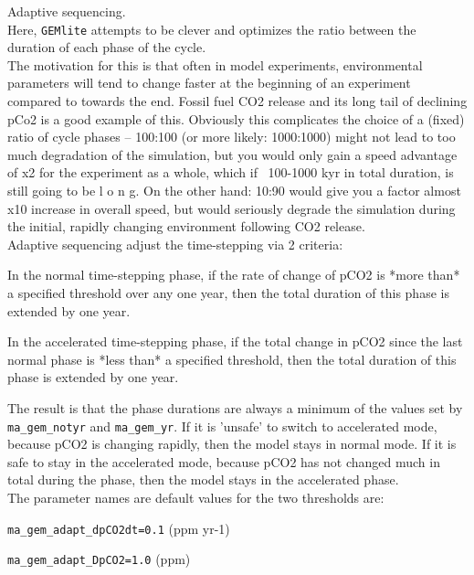\documentclass[10pt,twoside]{article}
\begin{document}
\begin{compactenum}
        \item Adaptive sequencing.
        \\Here, \texttt{GEMlite} attempts to be clever and optimizes the ratio between the duration of each phase of the cycle.
        \\The motivation for this is that often in model experiments, environmental parameters will  tend to change faster at the beginning of an experiment compared to towards the end. Fossil fuel CO2 release and its long tail of declining pCo2 is a good example of this. Obviously this complicates the choice of a (fixed) ratio of cycle phases -- 100:100 (or more likely: 1000:1000) might not lead to too much degradation of the simulation, but you would only gain a speed advantage of x2 for the experiment as a whole, which if ~100-1000 kyr in total duration, is still going to be l o n g. On the other hand: 10:90 would give you a factor almost x10 increase in overall speed, but would seriously degrade the simulation during the initial, rapidly changing environment following CO2 release.
        \\Adaptive sequencing adjust the time-stepping via 2 criteria:
\begin{compactitem}
        \item In the normal time-stepping phase, if the rate of change of pCO2 is *more than* a specified threshold over any one year, then the total duration of this phase is extended by one year.
        \item In the accelerated time-stepping phase, if the total change in pCO2 since the last normal phase is *less than* a specified threshold, then the total duration of this phase is extended by one year.
\end{compactitem}
The result is that the phase durations are always a minimum of the values set by \texttt{ma\_gem\_notyr} and \texttt{ma\_gem\_yr}. If it is 'unsafe' to switch to accelerated mode, because pCO2 is changing rapidly, then the model stays in normal mode. If it is safe to stay in the accelerated mode, because pCO2 has not changed much in total during the phase, then the model stays in the accelerated phase.
        \\The parameter names are default values for the two thresholds are:
\begin{compactitem}
        \item \texttt{ma\_gem\_adapt\_dpCO2dt=0.1} (ppm yr-1)
        \item \texttt{ma\_gem\_adapt\_DpCO2=1.0} (ppm)
\end{compactitem}

\end{compactenum}
\end{document}
